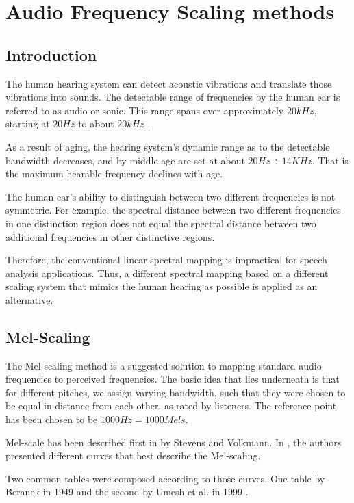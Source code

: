 \chapter{Audio Frequency Scaling methods}\label{ch:scaling_methods}
\section{Introduction}
The human hearing system can detect 
acoustic vibrations and translate 
those vibrations into sounds.
The detectable range of frequencies by the human ear
is referred to as audio or sonic. This range
spans over approximately \(20kHz\),
starting at \(20Hz\) to about \(20kHz\)
\cite{hearthres}.

As a result of aging, the hearing system's dynamic range 
as to the detectable bandwidth decreases,
and by middle-age are set at about
\(20Hz \div 14KHz\)\cite{Wiley2008ChangesIH}.
That is the maximum hearable frequency
declines with age.

The human ear's ability to distinguish 
between two different frequencies 
is not symmetric. 
For example, the spectral distance between two 
different frequencies in one distinction region does 
not equal the spectral distance 
between two additional frequencies in other distinctive regions.

Therefore, the conventional linear 
spectral mapping is impractical for
speech analysis applications.
Thus, a different spectral mapping 
based on a different scaling system
that mimics the human hearing as possible
is applied as an alternative.

\section{Mel-Scaling}
The Mel-scaling method 
is a suggested solution to mapping 
standard audio frequencies to perceived frequencies.
The basic idea that lies underneath is that for
different pitches, we assign varying bandwidth,
such that they were chosen to be equal in distance
from each other, as rated by listeners.
The reference point has been chosen to be 
\(1000 Hz = 1000 Mels\).

Mel-scale has been described first in \cite{Volkmann} by Stevens and Volkmann.
In \cite{Volkmann}, the authors presented different curves
that best describe the Mel-scaling.

Two common tables were composed
according to those curves. One table by 
Beranek in 1949 \cite{beranek1988acoustical} 
and the second by Umesh et al. in 1999 \cite{UmeshMel}.

